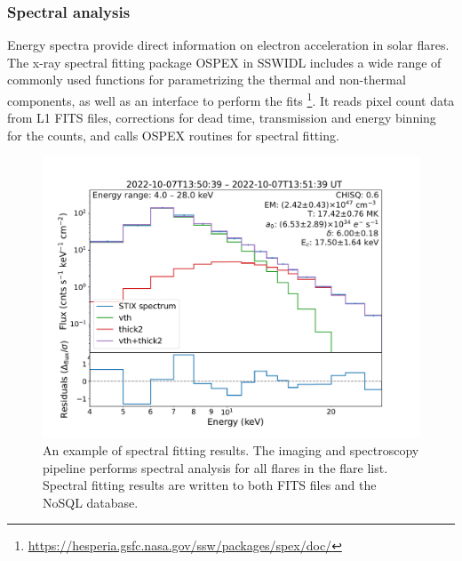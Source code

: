 \documentclass[referee]{aa} %
\begin{document}
\subsubsection{Spectral analysis}
Energy spectra provide direct information on electron acceleration in solar flares. 
The x-ray spectral fitting package OSPEX in SSWIDL includes a wide range of commonly used 
functions for parametrizing the thermal
and non-thermal components, as well as an interface to perform
the fits \footnote{\url{https://hesperia.gsfc.nasa.gov/ssw/packages/spex/doc/}}.
It reads pixel count data from L1 FITS files, corrections for dead time, transmission 
and energy binning for the counts,  
and calls  OSPEX routines for spectral fitting. 
\begin{figure}[h]
  \centering
  \includegraphics[width=0.9\linewidth]{figures/ospex.pdf}
  \caption{ 
    An example of spectral fitting results. The imaging and spectroscopy pipeline performs
    spectral analysis for all flares in the flare list. Spectral fitting results are written to both FITS files and 
    the NoSQL database.
   }
  \label{fig:ospex}
\end{figure}
\end{document}
